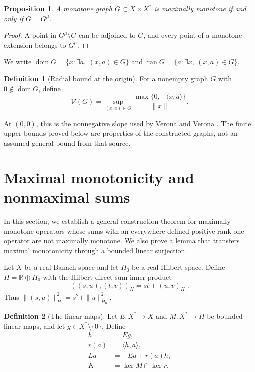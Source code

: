\documentclass[11pt]{article}
\newcommand{\R}{\mathbb R}
\newcommand{\dom}{\operatorname{dom}}
\newcommand{\pair}[2]{\langle #1,#2\rangle}
\newtheorem{proposition}{Proposition}
\theoremstyle{definition}
\newtheorem{definition}{Definition}
\theoremstyle{remark}
\begin{document}
\begin{proposition}
A monotone graph $G\subset X\times X^*$ is maximally monotone
if and only if $G=G^\mu$.
\end{proposition}
\begin{proof}
A point in $G^\mu\setminus G$ can be adjoined to $G$, and every
point of a monotone extension belongs to $G^\mu$.
\end{proof}

We write
$\dom G=\{x:\exists a,\ (x,a)\in G\}$ and
$\operatorname{ran}G=\{a:\exists x,\ (x,a)\in G\}$.


\begin{definition}[Radial bound at the origin]
For a nonempty graph $G$ with $0\notin\dom G$, define
\begin{equation}
\mathcal V(G)=\sup_{(x,a)\in G}
 \frac{\max\{0,-\pair{x}{a}\}}{\|x\|}.
\label{eq:D3}
\end{equation}
\end{definition}
At $(0,0)$, this is the nonnegative slope used by Verona and Verona
\cite{verona2008}. The finite upper bounds proved below are properties
of the constructed graphs, not an assumed general bound from that source.

\section{Maximal monotonicity and nonmaximal sums}
\label{sec:endpoint-criterion}

In this section, we establish a general construction theorem for
maximally monotone operators whose sums with an everywhere-defined
positive rank-one operator are not maximally monotone. We also prove
a lemma that transfers maximal monotonicity through a bounded linear
surjection.





Let $X$ be a real Banach space and let $H_0$ be a real Hilbert space.
Define $H=\R\oplus H_0$ with the Hilbert direct-sum inner product
\[
((s,u),(t,v))_H=st+(u,v)_{H_0}.
\]
Thus $\|(s,u)\|_H^2=s^2+\|u\|_{H_0}^2$.

\begin{definition}[The linear maps]
\label{def:construction-maps}
Let $E:X^*\to X$ and $M:X^*\to H$ be bounded linear maps, and let
$g\in X^*\setminus\{0\}$. Define
\[
\begin{aligned}
h&=Eg,\\
r(a)&=\pair{h}{a},\\
La&=-Ea+r(a)h,\\
K&=\ker M\cap\ker r.
\end{aligned}
\]
\end{definition}
\end{document}
